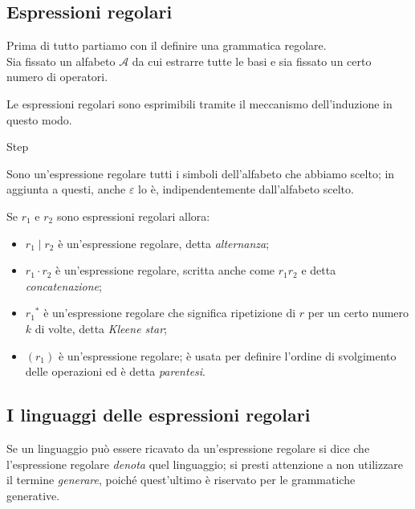 \documentclass[class=book, crop=false, oneside, 12pt]{standalone}
\begin{document}
\subsection{Espressioni regolari}
Prima di tutto partiamo con il definire una grammatica regolare.\\
Sia fissato un alfabeto \(\mathcal{A}\) da cui estrarre tutte le basi e sia fissato un certo numero di operatori.

Le espressioni regolari sono esprimibili tramite il meccanismo dell'induzione in questo modo.
\begin{labeling}{Step}
    \item[Base] Sono un'espressione regolare tutti i simboli dell’alfabeto che abbiamo scelto; in aggiunta a questi, anche \(\varepsilon\) lo è, indipendentemente dall'alfabeto scelto.
    \item[Step] Se \(r_1\) e \(r_2\) sono espressioni regolari allora:
    \begin{itemize}
        \item \(r_1 \mid r_2\) è un’espressione regolare, detta \emph{alternanza};
        \item \(r_1 \cdot r_2\) è un’espressione regolare, scritta anche come \(r_1 r_2\) e detta \emph{concatenazione};
        \item \(r_1\)\(^\ast\) è un’espressione regolare che significa ripetizione di \(r\) per un certo numero \(k\) di volte, detta \emph{Kleene star};
        \item \((r_1)\) è un’espressione regolare; è usata per definire l’ordine di svolgimento delle operazioni ed è detta \emph{parentesi}.
    \end{itemize} 
\end{labeling}

\subsection{I linguaggi delle espressioni regolari}
Se un linguaggio può essere ricavato da un'espressione regolare si dice che l'espressione regolare \emph{denota} quel linguaggio; si presti attenzione a non utilizzare il termine \emph{generare}, poiché quest'ultimo è riservato per le grammatiche generative.
\end{document}
